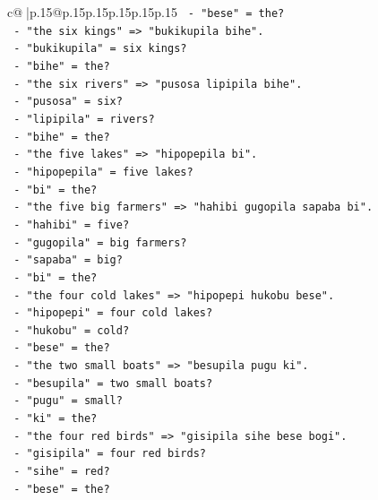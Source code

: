 \documentclass{article}
\begin{document}
{\begin{supertabular}{c@{$\;$}|p{.15\linewidth}@{}p{.15\linewidth}p{.15\linewidth}p{.15\linewidth}p{.15\linewidth}p{.15\linewidth}}
{{{\texttt{             {-} "bese" = the?} \\
\texttt{           {-} "the six kings" => "bukikupila bihe".} \\
\texttt{             {-} "bukikupila" = six kings?} \\
\texttt{             {-} "bihe" = the?} \\
\texttt{           {-} "the six rivers" => "pusosa lipipila bihe".} \\
\texttt{             {-} "pusosa" = six?} \\
\texttt{             {-} "lipipila" = rivers?} \\
\texttt{             {-} "bihe" = the?} \\
\texttt{           {-} "the five lakes" => "hipopepila bi".} \\
\texttt{             {-} "hipopepila" = five lakes?} \\
\texttt{             {-} "bi" = the?} \\
\texttt{           {-} "the five big farmers" => "hahibi gugopila sapaba bi".} \\
\texttt{             {-} "hahibi" = five?} \\
\texttt{             {-} "gugopila" = big farmers?} \\
\texttt{             {-} "sapaba" = big?} \\
\texttt{             {-} "bi" = the?} \\
\texttt{           {-} "the four cold lakes" => "hipopepi hukobu bese".} \\
\texttt{             {-} "hipopepi" = four cold lakes?} \\
\texttt{             {-} "hukobu" = cold?} \\
\texttt{             {-} "bese" = the?} \\
\texttt{           {-} "the two small boats" => "besupila pugu ki".} \\
\texttt{             {-} "besupila" = two small boats?} \\
\texttt{             {-} "pugu" = small?} \\
\texttt{             {-} "ki" = the?} \\
\texttt{           {-} "the four red birds" => "gisipila sihe bese bogi".} \\
\texttt{             {-} "gisipila" = four red birds?} \\
\texttt{             {-} "sihe" = red?} \\
\texttt{             {-} "bese" = the?} \\
}}}
\end{supertabular}}
\end{document}
